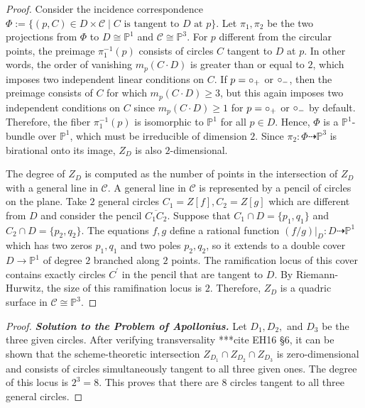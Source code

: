 \documentclass[11pt,a4paper]{article}
\newcommand{\PP}{\mathbb{P}}
\theoremstyle{mytheoremstyle}
\theoremstyle{mydefinitionstyle}
\begin{document}
\begin{proof}
    Consider the incidence correspondence $\Phi:= \{(p, C)\in D\times \mathcal{C}\mid C\text{ is tangent to }D \text{ at } p\}$. Let $\pi_1, \pi_2$ be the two projections from $\Phi$ to $D\cong \PP^1$ and $\mathcal{C}\cong \PP^3$. For $p$ different from the circular points, the preimage $\pi_1^{-1}(p)$ consists of circles $C$ tangent to $D$ at $p$. In other words, the order of vanishing $m_p(C\cdot D)$ is greater than or equal to $2$, which imposes two independent linear conditions on $C$. If $p = \circ_+$ or $\circ_-$, then the preimage consists of $C$ for which $m_p(C\cdot D)\geq 3$, but this again imposes two independent conditions on $C$ since $m_p(C\cdot D)\geq 1$ for $p = \circ_+$ or $\circ_-$ by default. Therefore, the fiber $\pi_1^{-1}(p)$ is isomorphic to $\PP^1$ for all $p \in D$. Hence, $\Phi$ is a $\PP^1$-bundle over $\PP^1$, which must be irreducible of dimension $2$. Since $\pi_2: \Phi\dashrightarrow \PP^3$ is birational onto its image, $Z_D$ is also $2$-dimensional. 

    The degree of $Z_D$ is computed as the number of points in the intersection of $Z_D$ with a general line in $\mathcal{C}$. A general line in $\mathcal{C}$ is represented by a pencil of circles on the plane. Take $2$ general circles $C_1 = Z[f], C_2=Z[g]$ which are different from $D$ and consider the pencil $\overline{C_1C_2}$. Suppose that $C_1\cap D = \{p_1, q_1\}$ and $C_2\cap D = \{p_2, q_2\}$.  The equations $f, g$ define a rational function $(f/g)|_D: D\dashrightarrow \PP^1$ which has two zeros $p_1, q_1$ and two poles $p_2, q_2$, so it extends to a double cover $D\to \PP^1$ of degree $2$ branched along $2$ points. The ramification locus of this cover contains exactly circles $C^\prime$ in the pencil that are tangent to $D$. By Riemann-Hurwitz, the size of this ramifination locus is $2$. Therefore, $Z_D$ is a quadric surface in $\mathcal{C}\cong \PP^3$. 
\end{proof}
\begin{proof}
    \textbf{\textit{Solution to the Problem of Apollonius.}} Let $D_1, D_2,$ and $D_3$ be the three given circles. After verifying transversality ***cite EH16 \S 6, it can be shown that the scheme-theoretic intersection $Z_{D_1}\cap Z_{D_2}\cap Z_{D_3}$ is zero-dimensional and consists of circles simultaneously tangent to all three given ones. The degree of this locus is $2^3 = 8$. This proves that there are $8$ circles tangent to all three general circles. 
\end{proof}
\end{document}
